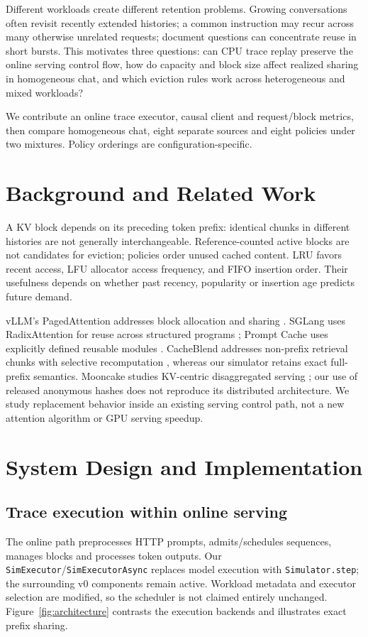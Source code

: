 \documentclass{article}
\begin{document}
Different workloads create different retention problems. Growing conversations often revisit recently extended histories; a common instruction may recur across many otherwise unrelated requests; document questions can concentrate reuse in short bursts. This motivates three questions: can CPU trace replay preserve the online serving control flow, how do capacity and block size affect realized sharing in homogeneous chat, and which eviction rules work across heterogeneous and mixed workloads?

We contribute an online trace executor, causal client and request/block metrics, then compare homogeneous chat, eight separate sources and eight policies under two mixtures. Policy orderings are configuration-specific.

\section{Background and Related Work}
A KV block depends on its preceding token prefix: identical chunks in different histories are not generally interchangeable. Reference-counted active blocks are not candidates for eviction; policies order unused cached content. LRU favors recent access, LFU allocator access frequency, and FIFO insertion order. Their usefulness depends on whether past recency, popularity or insertion age predicts future demand.

vLLM's PagedAttention addresses block allocation and sharing \citep{kwon2023}. SGLang uses RadixAttention for reuse across structured programs \citep{sglang}; Prompt Cache uses explicitly defined reusable modules \citep{promptcache}. CacheBlend addresses non-prefix retrieval chunks with selective recomputation \citep{cacheblend}, whereas our simulator retains exact full-prefix semantics. Mooncake studies KV-centric disaggregated serving \citep{mooncakepaper}; our use of released anonymous hashes does not reproduce its distributed architecture. We study replacement behavior inside an existing serving control path, not a new attention algorithm or GPU serving speedup.

\section{System Design and Implementation}
\subsection{Trace execution within online serving}
The online path preprocesses HTTP prompts, admits/schedules sequences, manages blocks and processes token outputs. Our \texttt{SimExecutor}/\texttt{SimExecutorAsync} replaces model execution with \texttt{Simulator.step}; the surrounding v0 components remain active. Workload metadata and executor selection are modified, so the scheduler is not claimed entirely unchanged. Figure~\ref{fig:architecture} contrasts the execution backends and illustrates exact prefix sharing.
\end{document}
